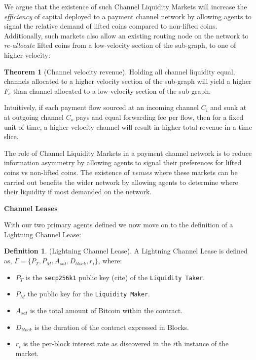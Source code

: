 \documentclass[10pt,a4paper]{article}
\theoremstyle{definition}
\newtheorem{definition}{Definition}[section]
\newtheorem{theorem}{Theorem}[section]
\begin{document}
We argue that the existence of such Channel Liquidity Markets will increase the
\emph{efficiency} of capital deployed to a payment channel network by allowing
agents to signal the relative demand of lifted coins compared to non-lifted
coins. Additionally, such markets also allow an existing routing node on the
network to \emph{re-allocate} lifted coins from a low-velocity section of the
sub-graph, to one of higher velocity: 

\begin{theorem}[Channel velocity revenue] %
Holding all channel liquidity equal, channels allocated to a higher velocity
section of the sub-graph will yield a higher $F_c$  than channel allocated to a
low-velocity section of the sub-graph. 
\end{theorem}

Intuitively, if each payment flow sourced at an incoming channel $C_i$ and sunk
at at outgoing channel $C_o$ pays and equal forwarding fee per flow, then for a
fixed unit of time, a higher velocity channel will result in higher total
revenue in a time slice. 

The role of Channel Liquidity Markets in a payment channel network is to reduce
information asymmetry by allowing agents to signal their preferences for lifted
coins vs non-lifted coins. The existence of \emph{venues} where these markets
can be carried out benefits the wider network by allowing agents to determine
where their liquidity if most demanded on the network. %

\begin{center}
\textbf{Channel Leases}
\end{center}

With our two primary agents defined we now move on to the definition of a
Lightning Channel Lease: 

\begin{definition}{(Lightning Channel Lease).} 
    A Lightning Channel Lease is defined as, $\Gamma = \{P_{T}, P_{M}, A_{sat},
    D_{block}, r_{i} \}$, where:
\end{definition}

\begin{itemize}
    \item $P_{T}$ is the \texttt{secp256k1} public key (cite) of the
\texttt{Liquidity Taker}. 
    \item $P_{M}$ the public key for the \texttt{Liquidity Maker}. 
    \item $A_{sat}$ is the total amount of Bitcoin within the contract.
    \item $D_{block}$ is the duration of the contract expressed in Blocks.
    \item $r_{i}$ is the per-block interest rate as discovered in the $i$th
    instance of the market.
\end{itemize}
\end{document}

